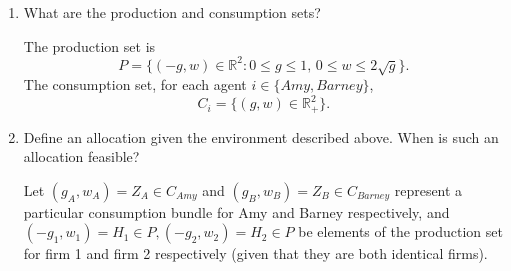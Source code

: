 \documentclass[11pt,english]{article}
\begin{document}
\begin{enumerate}[label = (\alph*)]
    \item What are the production and consumption sets?
\begin{solution}
The production set is $$P = \{(-g,w)\in \mathbb{R}^2: 0 \leq g \leq 1, \, 0 \leq w \leq 2\sqrt{g}\}.$$ The consumption set, for each agent $i\in \{Amy, Barney\}$, $$C_i = \{(g,w)\in \mathbb{R}^2_+\}.$$
\end{solution}
    \item Define an allocation given the environment described above. When is such an allocation feasible?
\begin{solution}
Let $(g_A,w_A) = Z_A \in C_{Amy}$ and $(g_B,w_B) = Z_B \in C_{Barney}$ represent a particular consumption bundle for Amy and Barney respectively, and $(-g_1, w_1) = H_1\in P, (-g_2, w_2) = H_2 \in P$ be elements of the production set for firm 1 and firm 2 respectively (given that they are both identical firms).


\end{solution}
\end{enumerate}
\end{document}
